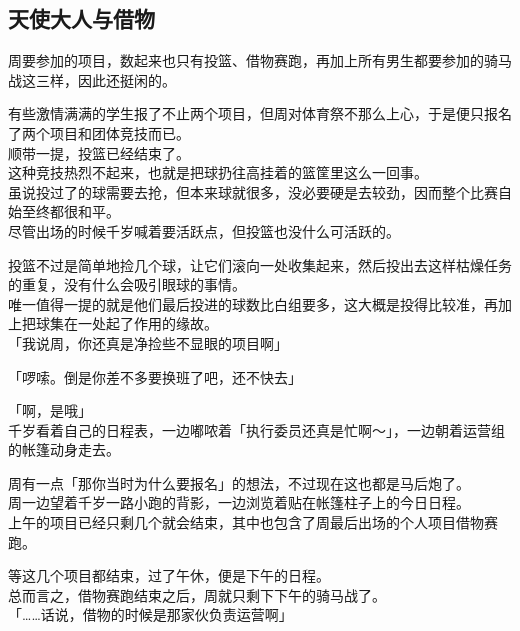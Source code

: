 \subsection{天使大人与借物}

周要参加的项目，数起来也只有投篮、借物赛跑，再加上所有男生都要参加的骑马战这三样，因此还挺闲的。

有些激情满满的学生报了不止两个项目，但周对体育祭不那么上心，于是便只报名了两个项目和团体竞技而已。\\

顺带一提，投篮已经结束了。\\

这种竞技热烈不起来，也就是把球扔往高挂着的篮筐里这么一回事。\\

虽说投过了的球需要去抢，但本来球就很多，没必要硬是去较劲，因而整个比赛自始至终都很和平。\\

尽管出场的时候千岁喊着要活跃点，但投篮也没什么可活跃的。

投篮不过是简单地捡几个球，让它们滚向一处收集起来，然后投出去这样枯燥任务的重复，没有什么会吸引眼球的事情。\\

唯一值得一提的就是他们最后投进的球数比白组要多，这大概是投得比较准，再加上把球集在一处起了作用的缘故。\\

「我说周，你还真是净捡些不显眼的项目啊」

「啰嗦。倒是你差不多要换班了吧，还不快去」

「啊，是哦」\\

千岁看着自己的日程表，一边嘟哝着「执行委员还真是忙啊～」，一边朝着运营组的帐篷动身走去。

周有一点「那你当时为什么要报名」的想法，不过现在这也都是马后炮了。\\

周一边望着千岁一路小跑的背影，一边浏览着贴在帐篷柱子上的今日日程。\\

上午的项目已经只剩几个就会结束，其中也包含了周最后出场的个人项目借物赛跑。

等这几个项目都结束，过了午休，便是下午的日程。\\

总而言之，借物赛跑结束之后，周就只剩下下午的骑马战了。\\

「……话说，借物的时候是那家伙负责运营啊」\\

